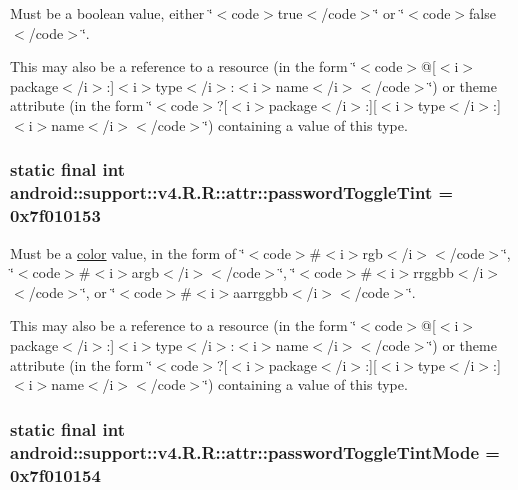 Must be a boolean value, either \char`\"{}$<$code$>$true$<$/code$>$\char`\"{} or \char`\"{}$<$code$>$false$<$/code$>$\char`\"{}. 

This may also be a reference to a resource (in the form \char`\"{}$<$code$>$@\mbox{[}$<$i$>$package$<$/i$>$:\mbox{]}$<$i$>$type$<$/i$>$:$<$i$>$name$<$/i$>$$<$/code$>$\char`\"{}) or theme attribute (in the form \char`\"{}$<$code$>$?\mbox{[}$<$i$>$package$<$/i$>$:\mbox{]}\mbox{[}$<$i$>$type$<$/i$>$:\mbox{]}$<$i$>$name$<$/i$>$$<$/code$>$\char`\"{}) containing a value of this type. \hypertarget{classandroid_1_1support_1_1v4_1_1_r_1_1attr_a3e15aedc0417f178ca1634c9868464b}{
\subsubsection[{passwordToggleTint}]{\setlength{\rightskip}{0pt plus 5cm}static final int android::support::v4.R.R::attr::passwordToggleTint = 0x7f010153}}
\label{classandroid_1_1support_1_1v4_1_1_r_1_1attr_a3e15aedc0417f178ca1634c9868464b}


Must be a \hyperlink{classandroid_1_1support_1_1v4_1_1_r_1_1color}{color} value, in the form of \char`\"{}$<$code$>$\#$<$i$>$rgb$<$/i$>$$<$/code$>$\char`\"{}, \char`\"{}$<$code$>$\#$<$i$>$argb$<$/i$>$$<$/code$>$\char`\"{}, \char`\"{}$<$code$>$\#$<$i$>$rrggbb$<$/i$>$$<$/code$>$\char`\"{}, or \char`\"{}$<$code$>$\#$<$i$>$aarrggbb$<$/i$>$$<$/code$>$\char`\"{}. 

This may also be a reference to a resource (in the form \char`\"{}$<$code$>$@\mbox{[}$<$i$>$package$<$/i$>$:\mbox{]}$<$i$>$type$<$/i$>$:$<$i$>$name$<$/i$>$$<$/code$>$\char`\"{}) or theme attribute (in the form \char`\"{}$<$code$>$?\mbox{[}$<$i$>$package$<$/i$>$:\mbox{]}\mbox{[}$<$i$>$type$<$/i$>$:\mbox{]}$<$i$>$name$<$/i$>$$<$/code$>$\char`\"{}) containing a value of this type. \hypertarget{classandroid_1_1support_1_1v4_1_1_r_1_1attr_0ce1c460330a46123eff39278bef90be}{
\subsubsection[{passwordToggleTintMode}]{\setlength{\rightskip}{0pt plus 5cm}static final int android::support::v4.R.R::attr::passwordToggleTintMode = 0x7f010154}}
\label{classandroid_1_1support_1_1v4_1_1_r_1_1attr_0ce1c460330a46123eff39278bef90be}


